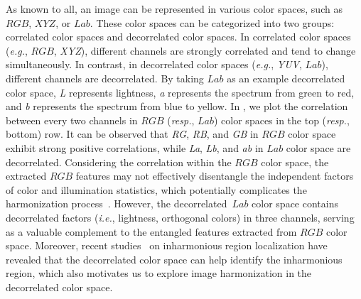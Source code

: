 \documentclass[sigconf]{acmart}
\begin{document}
As known to all, an image can be represented in various color spaces, such as $RGB$, $XYZ$, or $Lab$. 
These color spaces can be categorized into two groups: correlated color spaces and decorrelated color spaces. 
In correlated color spaces (\emph{e.g.}, $RGB$, \textit{XYZ}),  different channels are strongly correlated and tend to change simultaneously. 
In contrast, in decorrelated color spaces (\emph{e.g.}, \textit{YUV}, $Lab$), different channels are decorrelated.
By taking $Lab$ as an example decorrelated color space, \textit{L} represents lightness, \textit{a} represents the spectrum from green to red, and \textit{b} represents the spectrum from blue to yellow. 
In , we plot the correlation between every two channels in $RGB$ (\emph{resp.}, $Lab$) color spaces in the top (\emph{resp.}, bottom) row. It can be observed that  \textit{RG}, \textit{RB}, and \textit{GB} in $RGB$ color space exhibit strong positive correlations, while \textit{La}, \textit{Lb}, and \textit{ab} in $Lab$ color space are decorrelated.
Considering the correlation within the $RGB$ color space, the extracted $RGB$ features may not effectively disentangle the independent factors of color and illumination statistics, which potentially complicates the harmonization process~\cite{dovenet,issam,rainnet,ssam}. 
However, the decorrelated~$Lab$ color space contains decorrelated factors (\emph{i.e.}, lightness, orthogonal colors) in three channels, serving as a valuable complement to the entangled features extracted from $RGB$ color space. 
Moreover, recent studies~\cite{liang2022inharmonious, wu2022inharmonious} on inharmonious region localization have revealed that the decorrelated color space can help identify the inharmonious region, which also motivates us to explore image harmonization in the decorrelated color space. 
\end{document}
